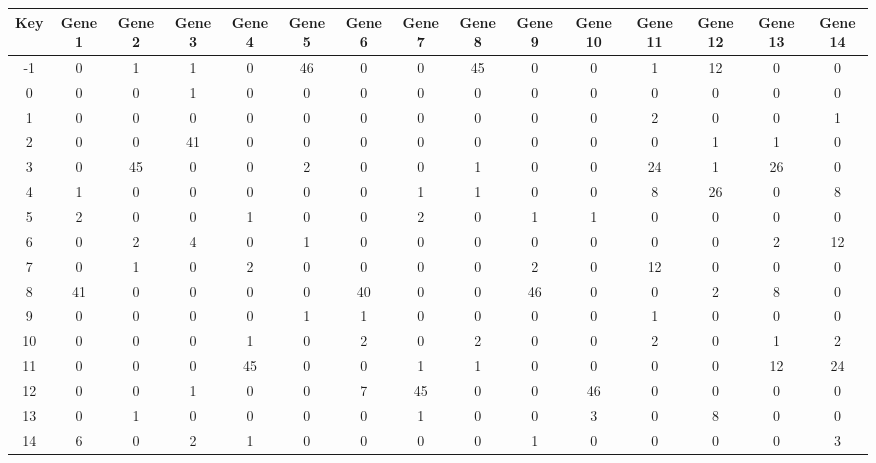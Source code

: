 \begin{tabular}{|c|c|c|c|c|c|c|c|c|c|c|c|c|c|c|}
\hline
Key & Gene 1 & Gene 2 & Gene 3 & Gene 4 & Gene 5 & Gene 6 & Gene 7 & Gene 8 & Gene 9 & Gene 10 & Gene 11 & Gene 12 & Gene 13 & Gene 14 \\
\hline
-1 & 0 & 1 & 1 & 0 & 46 & 0 & 0 & 45 & 0 & 0 & 1 & 12 & 0 & 0 \\
0 & 0 & 0 & 1 & 0 & 0 & 0 & 0 & 0 & 0 & 0 & 0 & 0 & 0 & 0 \\
1 & 0 & 0 & 0 & 0 & 0 & 0 & 0 & 0 & 0 & 0 & 2 & 0 & 0 & 1 \\
2 & 0 & 0 & 41 & 0 & 0 & 0 & 0 & 0 & 0 & 0 & 0 & 1 & 1 & 0 \\
3 & 0 & 45 & 0 & 0 & 2 & 0 & 0 & 1 & 0 & 0 & 24 & 1 & 26 & 0 \\
4 & 1 & 0 & 0 & 0 & 0 & 0 & 1 & 1 & 0 & 0 & 8 & 26 & 0 & 8 \\
5 & 2 & 0 & 0 & 1 & 0 & 0 & 2 & 0 & 1 & 1 & 0 & 0 & 0 & 0 \\
6 & 0 & 2 & 4 & 0 & 1 & 0 & 0 & 0 & 0 & 0 & 0 & 0 & 2 & 12 \\
7 & 0 & 1 & 0 & 2 & 0 & 0 & 0 & 0 & 2 & 0 & 12 & 0 & 0 & 0 \\
8 & 41 & 0 & 0 & 0 & 0 & 40 & 0 & 0 & 46 & 0 & 0 & 2 & 8 & 0 \\
9 & 0 & 0 & 0 & 0 & 1 & 1 & 0 & 0 & 0 & 0 & 1 & 0 & 0 & 0 \\
10 & 0 & 0 & 0 & 1 & 0 & 2 & 0 & 2 & 0 & 0 & 2 & 0 & 1 & 2 \\
11 & 0 & 0 & 0 & 45 & 0 & 0 & 1 & 1 & 0 & 0 & 0 & 0 & 12 & 24 \\
12 & 0 & 0 & 1 & 0 & 0 & 7 & 45 & 0 & 0 & 46 & 0 & 0 & 0 & 0 \\
13 & 0 & 1 & 0 & 0 & 0 & 0 & 1 & 0 & 0 & 3 & 0 & 8 & 0 & 0 \\
14 & 6 & 0 & 2 & 1 & 0 & 0 & 0 & 0 & 1 & 0 & 0 & 0 & 0 & 3 \\
\hline
\end{tabular}